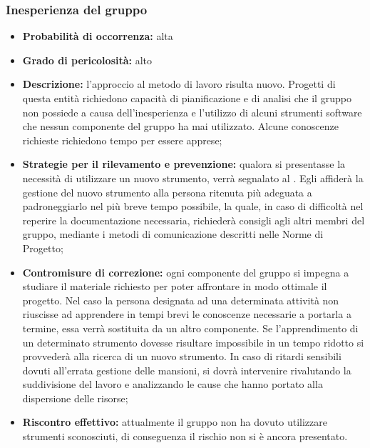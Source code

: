 \subsubsection{Inesperienza del gruppo}
\hypertarget{subsubsect:inesperienza}{}
\begin{itemize}
\item \textbf{Probabilità di occorrenza:} alta
\item \textbf{Grado di pericolosità:} alto

\item \textbf{Descrizione:} l'approccio al metodo di lavoro risulta nuovo. Progetti di questa entità richiedono capacità di pianificazione e di analisi che il gruppo non possiede a causa dell'inesperienza e l'utilizzo di alcuni strumenti software che nessun componente del gruppo ha mai utilizzato. Alcune conoscenze richieste richiedono tempo per essere apprese;

\item \textbf{Strategie per il rilevamento e prevenzione:} qualora si presentasse la necessità di utilizzare un nuovo strumento, verrà segnalato al \ruoloResponsabile. Egli affiderà la gestione del nuovo strumento alla persona ritenuta più adeguata a padroneggiarlo nel più breve tempo possibile, la quale, in caso di difficoltà nel reperire la documentazione necessaria, richiederà consigli agli altri membri del gruppo, mediante i metodi di comunicazione descritti nelle Norme di Progetto; 

\item \textbf{Contromisure di correzione:} ogni componente del gruppo si impegna a studiare il materiale richiesto per poter affrontare in modo ottimale il progetto. Nel caso la persona designata ad una determinata attività non riuscisse ad apprendere in tempi brevi le conoscenze necessarie a portarla a termine, essa verrà sostituita da un altro componente. Se l'apprendimento di un determinato strumento dovesse risultare impossibile in un tempo ridotto si provvederà alla ricerca di un nuovo strumento. In caso di ritardi sensibili dovuti all'errata gestione delle mansioni, si dovrà intervenire rivalutando la suddivisione
del lavoro e analizzando le cause che hanno portato alla dispersione delle risorse;

\item \textbf{Riscontro effettivo:} attualmente il gruppo non ha dovuto utilizzare strumenti sconosciuti, di conseguenza il rischio non si è ancora presentato.
\end{itemize}


